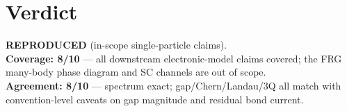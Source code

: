 \documentclass[11pt]{article}
\begin{document}
\section{Verdict}
\textbf{REPRODUCED} (in-scope single-particle claims). \\
\textbf{Coverage: 8/10} --- all downstream electronic-model claims covered; the
FRG many-body phase diagram and SC channels are out of scope. \\
\textbf{Agreement: 8/10} --- spectrum exact; gap/Chern/Landau/3Q all match with
convention-level caveats on gap magnitude and residual bond current.
\end{document}
